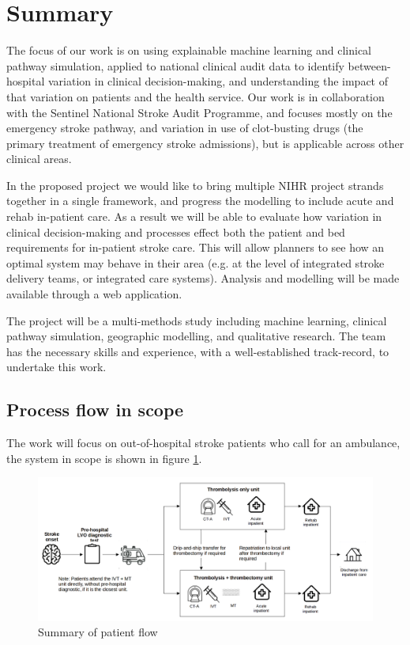 \section{Summary}

The focus of our work is on using explainable machine learning and clinical pathway simulation, applied to national clinical audit data to identify between-hospital variation in clinical decision-making, and understanding the impact of that variation on patients and the health service. Our work is in collaboration with the Sentinel National Stroke Audit Programme, and focuses mostly on the emergency stroke pathway, and variation in use of clot-busting drugs (the primary treatment of emergency stroke admissions), but is applicable across other clinical areas.

In the proposed project we would like to bring multiple NIHR project strands together in a single framework, and progress the modelling to include acute and rehab in-patient care. As a result we will be able to evaluate how variation in clinical decision-making and processes effect both the patient and bed requirements for in-patient stroke care. This will allow planners to see how an optimal system may behave in their area (e.g. at the level of integrated stroke delivery teams, or integrated care systems). Analysis and modelling will be made available through a web application.

The project will be a multi-methods study including machine learning, clinical pathway simulation, geographic modelling, and qualitative research. The team has the necessary skills and experience, with a well-established track-record, to undertake this work.

\subsection{Process flow in scope}

The work will focus on out-of-hospital stroke patients who call for an ambulance, the system in scope is shown in figure \ref{fig:flow}.

\begin{figure}[h]
\centering
\includegraphics[width=1.0\textwidth]{./images/pathway}
\caption{Summary of patient flow}
\label{fig:flow}
\end{figure}


